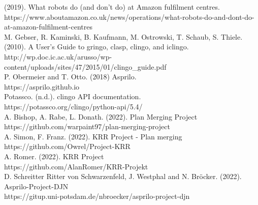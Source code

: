 \documentclass{llncs}
\begin{document}
\newpage
\begin{thebibliography}{8}
(2019). What robots do (and don’t do) at Amazon fulfilment centres.\\
https://www.aboutamazon.co.uk/news/operations/what-robots-do-and-dont-do-at-amazon-fulfilment-centres\\
M. Gebser, R. Kaminski, B. Kaufmann, M. Ostrowski, T. Schaub, S. Thiele. (2010). A User’s Guide to gringo, clasp, clingo, and iclingo.\\ http://wp.doc.ic.ac.uk/arusso/wp-content/uploads/sites/47/2015/01/clingo\_guide.pdf\\
P. Obermeier and T. Otto. (2018) Asprilo.\\
https://asprilo.github.io\\
Potassco. (n.d.). clingo API documentation.\\
https://potassco.org/clingo/python-api/5.4/\\
A. Bishop, A. Rabe, L. Donath. (2022). Plan Merging Project\\ https://github.com/warpaint97/plan-merging-project\\
A. Simon, F. Franz. (2022). KRR Project - Plan merging\\
https://github.com/Owrel/Project-KRR\\
A. Romer. (2022). KRR Project\\
https://github.com/AlanRomer/KRR-Projekt\\
D. Schreitter Ritter von Schwarzenfeld, J. Westphal and N. Bröcker. (2022). Asprilo-Project-DJN\\
https://gitup.uni-potsdam.de/nbroecker/asprilo-project-djn\\
\end{thebibliography}
\end{document}
